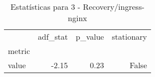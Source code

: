 \begin{table}[htbp]
\caption{Estatísticas para 3 - Recovery/ingress-nginx}
\label{tab:3_-_recovery_ingress-nginx_adf_test}
\begin{tabular}{lrrr}
\toprule
 & adf_stat & p_value & stationary \\
metric &  &  &  \\
\midrule
value & -2.15 & 0.23 & False \\
\bottomrule
\end{tabular}
\end{table}
